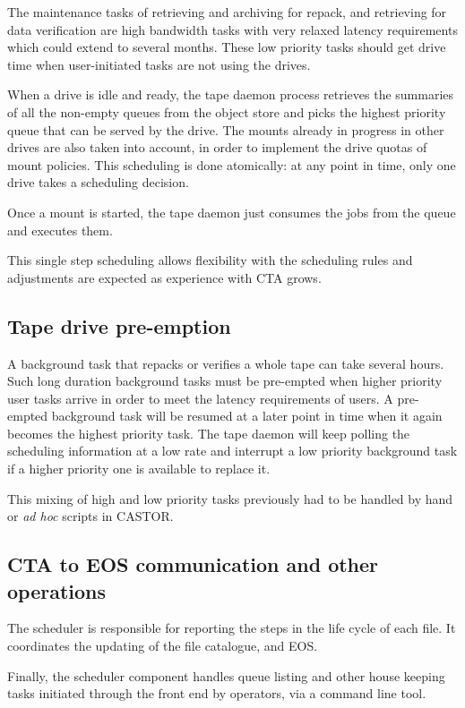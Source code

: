 \documentclass[a4paper]{jpconf}
\begin{document}
The maintenance tasks of retrieving and archiving for repack, and retrieving for
data verification are high bandwidth tasks with very relaxed latency
requirements which could extend to several months. These low priority tasks
should get drive time when user-initiated tasks are not using the drives.

When a drive is idle and ready, the tape daemon process retrieves the summaries
of all the non-empty queues from the object store and picks the highest priority
queue that can be served by the drive. The mounts already in progress in other
drives are  also taken into account, in order to implement the drive quotas of
mount policies. This scheduling is done  atomically: at any point in time, only
one drive takes a scheduling decision.

Once a mount is started, the tape daemon just consumes the jobs from the queue and
executes them.

This single step scheduling allows flexibility with the scheduling rules and
adjustments are expected as experience with CTA grows.

\subsection{Tape drive pre-emption}
A background task that repacks or verifies a whole tape can take several hours.
Such long duration background tasks must be pre-empted when higher priority user
tasks arrive in order to meet the latency requirements of users.  A pre-empted
background task will be resumed at a later point in time when it again becomes
the highest priority task.  The tape daemon will keep polling the scheduling
information at a low rate and interrupt a low priority background task if a
higher priority one is available to replace it.

This mixing of high and low priority tasks previously had to be handled by hand or \textit{ad hoc}
scripts in CASTOR.

\subsection{CTA to EOS communication and other operations}
The scheduler is responsible for reporting the steps in the life cycle of each
file.  It coordinates the updating of the file catalogue, and EOS.

Finally, the scheduler component handles queue listing and other house keeping
tasks initiated through the front end by operators, via a command line tool.
\end{document}
